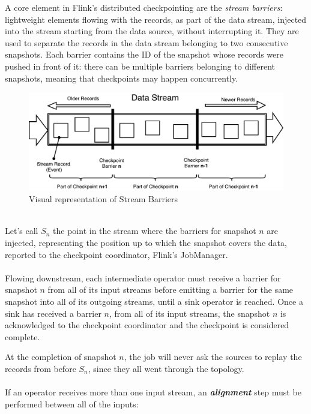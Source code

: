 A core element in Flink’s distributed checkpointing are the \textit{stream barriers}: lightweight elements flowing with the records, as part of the data stream, injected into the stream starting from the data source, without interrupting it. They are used to separate the records in the data stream belonging to two consecutive snapshots. Each barrier contains the ID of the snapshot whose records were pushed in front of it: there can be multiple barriers belonging to different snapshots, meaning that checkpoints may happen concurrently.
\\
\begin{figure}[!htb]
    \centering
    \includegraphics[width=1\linewidth]{Figures/stream_barriers}
    \caption{Visual representation of Stream Barriers}
    \label{fig:streambarriers}
\end{figure}
\\
Let's call $S_n$ the point in the stream where the barriers for snapshot $n$ are injected, representing the position up to which the snapshot covers the data, reported to the checkpoint coordinator, Flink’s JobManager.
\\\\
Flowing downstream, each intermediate operator must receive a barrier for snapshot $n$ from all of its input streams before emitting a barrier for the same snapshot into all of its outgoing streams, until a sink operator is reached. Once a sink has received a barrier $n$, from all of its input streams, the snapshot $n$ is acknowledged to the checkpoint coordinator and the checkpoint is considered complete.

At the completion of snapshot $n$, the job will never ask the sources to replay the records from before $S_n$, since they all went through the topology.
\\\\
If an operator receives more than one input stream, an \textit{\textbf{alignment}} step must be performed between all of the inputs:

